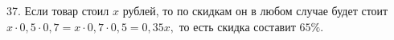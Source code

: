37. Если товар стоил $x$ рублей, то по скидкам он в любом случае будет стоит $x\cdot0,5\cdot0,7=x\cdot0,7\cdot0,5=0,35x,$ то есть скидка составит $65\%.$\\
